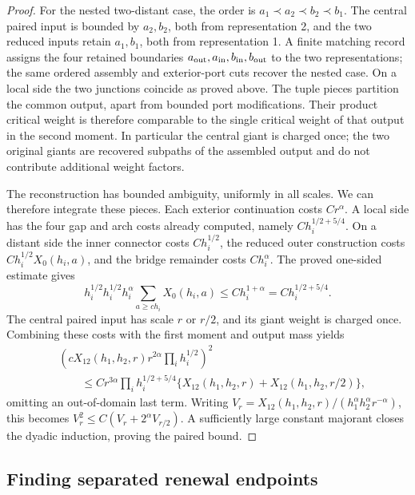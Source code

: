 \begin{proof}
For the nested two-distant case, the order is
\(a_1\prec a_2\prec b_2\prec b_1\). The central paired input is
bounded by \(a_2,b_2\), both from representation 2, and the two
reduced inputs retain \(a_1,b_1\), both from representation 1.
A finite matching record assigns the four retained boundaries
\(a_{\rm out},a_{\rm in},b_{\rm in},b_{\rm out}\)
to the two representations; the same ordered assembly and exterior-port cuts recover the nested
case. On a local side the two junctions coincide as proved above.
The tuple pieces partition the common output, apart from bounded
port modifications. Their product critical weight is therefore
comparable to the single critical weight of that output in the
second moment. In particular the central giant is charged once;
the two original giants are recovered subpaths of the assembled
output and do not contribute additional weight factors.

The reconstruction has bounded ambiguity, uniformly in all scales.
We can therefore integrate these pieces. Each exterior continuation
costs \(Cr^\alpha\). A local side has the four gap and arch costs
already computed, namely \(Ch_i^{1/2+5/4}\). On a distant side the
inner connector costs \(Ch_i^{1/2}\), the reduced outer construction
costs \(Ch_i^{1/2}X_0(h_i,a)\), and the bridge remainder costs
\(Ch_i^\alpha\). The proved one-sided estimate gives
\[
 h_i^{1/2}h_i^{1/2}h_i^\alpha
       \sum_{a\ge c h_i}X_0(h_i,a)
 \le Ch_i^{1+\alpha}=Ch_i^{1/2+5/4}.
\]
The central paired input has scale \(r\) or \(r/2\), and its giant
weight is charged once. Combining these costs with the first moment
and output mass yields
\[
 \begin{split}
 &\left(cX_{12}(h_1,h_2,r)r^{2\alpha}\prod_i h_i^{1/2}\right)^2\\
 &\qquad\le Cr^{3\alpha}\prod_i h_i^{1/2+5/4}
  \{X_{12}(h_1,h_2,r)+X_{12}(h_1,h_2,r/2)\},
 \end{split}
\]
omitting an out-of-domain last term. Writing
\(V_r=X_{12}(h_1,h_2,r)/(h_1^\alpha h_2^\alpha r^{-\alpha})\),
this becomes
\(V_r^2\le C(V_r+2^\alpha V_{r/2})\). A sufficiently large constant
majorant closes the dyadic induction, proving the paired bound.
\end{proof}

\subsection{Finding separated renewal endpoints}

